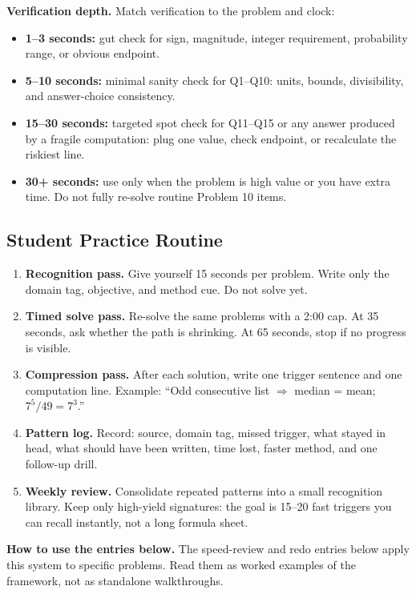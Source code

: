 \documentclass[11pt]{article}
\begin{document}
\textbf{Verification depth.} Match verification to the problem and clock:
\begin{itemize}
  \item \textbf{1--3 seconds:} gut check for sign, magnitude, integer requirement, probability range, or obvious endpoint.
  \item \textbf{5--10 seconds:} minimal sanity check for Q1--Q10: units, bounds, divisibility, and answer-choice consistency.
  \item \textbf{15--30 seconds:} targeted spot check for Q11--Q15 or any answer produced by a fragile computation: plug one value, check endpoint, or recalculate the riskiest line.
  \item \textbf{30+ seconds:} use only when the problem is high value or you have extra time. Do not fully re-solve routine Problem 10 items.
\end{itemize}

\subsection{Student Practice Routine}

\begin{enumerate}
  \item \textbf{Recognition pass.} Give yourself 15 seconds per problem. Write only the domain tag, objective, and method cue. Do not solve yet.
  \item \textbf{Timed solve pass.} Re-solve the same problems with a 2:00 cap. At 35 seconds, ask whether the path is shrinking. At 65 seconds, stop if no progress is visible.
  \item \textbf{Compression pass.} After each solution, write one trigger sentence and one computation line. Example: ``Odd consecutive list \(\Rightarrow\) median = mean; \(7^5/49=7^3\).''
  \item \textbf{Pattern log.} Record: source, domain tag, missed trigger, what stayed in head, what should have been written, time lost, faster method, and one follow-up drill.
  \item \textbf{Weekly review.} Consolidate repeated patterns into a small recognition library. Keep only high-yield signatures: the goal is 15--20 fast triggers you can recall instantly, not a long formula sheet.
\end{enumerate}

\textbf{How to use the entries below.} The speed-review and redo entries below apply this system to specific problems. Read them as worked examples of the framework, not as standalone walkthroughs.
\end{document}
